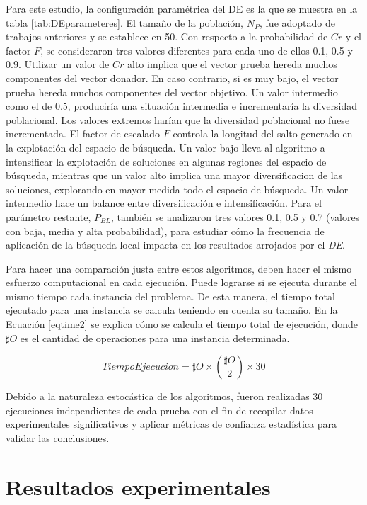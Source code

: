Para este estudio, la configuración paramétrica del DE es la que se muestra en la tabla \ref{tab:DEparameteres}. El tamaño de la población, $ N_P $, fue adoptado de trabajos anteriores y se establece en 50. Con respecto a la probabilidad de $Cr$ y el factor $F$, se consideraron tres valores diferentes para cada uno de ellos 0.1, 0.5 y 0.9.
Utilizar un valor de $Cr$ alto implica que el vector prueba hereda muchos componentes del vector donador. En caso contrario, si es muy bajo, el vector prueba hereda muchos componentes del vector objetivo. Un valor intermedio como el de 0.5, produciría una situación intermedia e incrementaría la diversidad poblacional. Los valores extremos harían que la diversidad poblacional no fuese incrementada.
El factor de escalado $F$ controla la longitud del salto generado en la explotación del espacio de búsqueda. Un valor bajo lleva al algoritmo a intensificar la explotación de soluciones en algunas regiones del espacio de búsqueda, mientras que un valor alto implica una mayor diversificacion de las soluciones, explorando en mayor medida todo el espacio de búsqueda. Un valor intermedio hace un balance entre diversificación e intensificación.
Para el parámetro restante, $ P_{BL} $, también se analizaron tres valores 0.1, 0.5 y 0.7 (valores con baja, media y alta probabilidad), para estudiar cómo la frecuencia de aplicación de la búsqueda local impacta en los resultados arrojados por el \textit{DE}.


Para hacer una comparación justa entre estos algoritmos, deben hacer el mismo esfuerzo computacional en cada ejecución. Puede lograrse si se ejecuta durante el mismo tiempo cada instancia del problema. De esta manera, el tiempo total ejecutado para una instancia se calcula teniendo en cuenta su tamaño. En la Ecuación \ref{eqtime2} se explica cómo se calcula el tiempo total de ejecución, donde $\sharp O $ es el cantidad de operaciones para una instancia determinada.

\begin{equation}\label{eqtime2}
TiempoEjecucion = \sharp O \times (\frac{\sharp O}{2})\times 30 
\end{equation}

Debido a la naturaleza estocástica de los algoritmos, fueron realizadas 30 ejecuciones independientes de cada prueba con el fin de recopilar datos experimentales significativos y aplicar métricas de confianza estadística para validar las conclusiones.


\section{Resultados experimentales}

